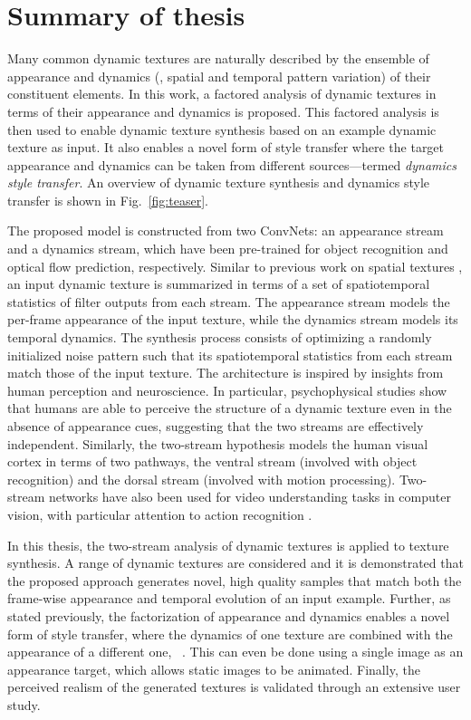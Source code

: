 \section{Summary of thesis}

Many common dynamic textures are naturally described by the ensemble of 
appearance and dynamics (\ie, spatial and temporal pattern variation) of their 
constituent elements. In this work, a factored analysis of dynamic 
textures in terms of their appearance and dynamics is proposed.
This factored analysis is then used to enable dynamic texture synthesis
based on an example dynamic texture as input.
It also enables a novel form of style transfer where the 
target appearance and dynamics can be taken from different sources---termed \emph{dynamics style transfer}.
An overview of dynamic texture synthesis and dynamics style transfer
is shown in Fig.\ \ref{fig:teaser}.

The proposed model is constructed from two ConvNets: an appearance stream and a dynamics stream,
which have been pre-trained for object recognition
and optical flow prediction, respectively.
Similar to previous work on spatial textures
\cite{gatys2015,heeger1995pyramid,portilla2000parametric}, an input dynamic texture is summarized in terms of a set of
spatiotemporal statistics of filter outputs from each stream.
The appearance stream models the per-frame appearance of
the input texture, while the dynamics stream models its
temporal dynamics.
The synthesis process consists of optimizing a randomly initialized noise pattern such that its spatiotemporal statistics from
each stream match those of the input texture.
The architecture is inspired by insights from human perception and 
neuroscience.
In particular, psychophysical studies \cite{cutting1982} show that
humans are able to perceive the structure of a dynamic texture even
in the absence of appearance cues, suggesting that the two streams
are effectively independent.
Similarly, the two-stream hypothesis \cite{goodale1992} models the 
human visual cortex in terms of two pathways, the ventral stream
(involved with object recognition) and the
dorsal stream (involved with motion processing). Two-stream networks have also been used for video understanding tasks in computer vision, with particular attention to action recognition \cite{simonyan2014,feichtenhofer2016two}.

In this thesis, the two-stream analysis of
dynamic textures is applied to texture synthesis.
A range of dynamic textures are considered and it is demonstrated that the 
proposed approach generates novel, high quality samples that match
both the frame-wise appearance and temporal evolution of an input
example.
Further, as stated previously, the factorization of appearance and dynamics enables a 
novel form of style transfer, where the dynamics of one texture are 
combined with the appearance of a different one,
\cf\ \cite{gatys2016image}.
This can even be done using a single image as an appearance
target, which allows static images to be animated.
Finally, the perceived realism of the generated textures is validated
through an extensive user study.

